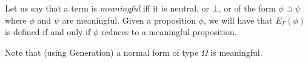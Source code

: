 \begin{code}
\\
\> \AgdaSymbol{\{} \AgdaSymbol{=}  \AgdaSymbol{\_\}} \AgdaSymbol{=} \<%
\\
\> \AgdaSymbol{\{} \AgdaSymbol{=}  \AgdaSymbol{\_} \AgdaSymbol{\}} \AgdaSymbol{\{}\AgdaSymbol{\}} \AgdaSymbol{=}    \<%
\end{code}

Let us say that a term is \emph{meaningful} iff it is neutral, or $\bot$, or of the form $\phi \supset \psi$ where $\phi$ and $\psi$ are meaningful.  Given a proposition $\phi$, we will have that $E_\Gamma(\phi)$ is defined if and only if $\phi$ reduces to a meaningful proposition.

Note that (using Generation) a normal form of type $\Omega$ is meaningful.


